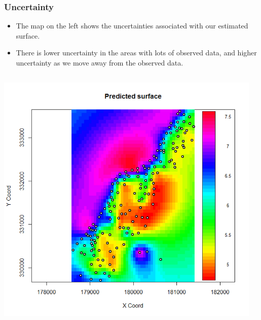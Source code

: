 \documentclass[parskip,12pt]{beamer}
\begin{document}
\begin{frame}
\frametitle{Uncertainty}
 \begin{itemize}
 \vspace{1mm}
\item The map on the left shows the uncertainties associated with our estimated surface.
\vspace{3mm}
\item There is lower uncertainty in the areas with lots of observed data, and higher uncertainty as we move away from the observed data.
\end{itemize}
\vspace{-2mm}
\begin{columns}
\begin{column}{0.5\textwidth}
    \begin{center}
     \includegraphics[width=\textwidth]{MeuseSurface}
          \end{center}
\end{column}
\begin{column}{0.5\textwidth}
    \begin{center}

\end{center}
\end{column}
\end{columns}
\end{frame}
\end{document}
